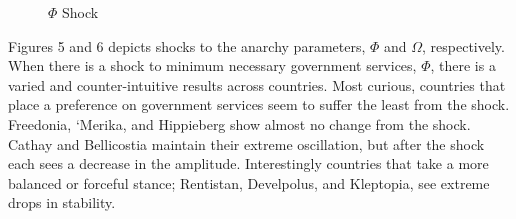 \documentclass[12pt]{article}
\begin{document}
\begin{spacing}{1.5}
\begin{figure}[htb]
\centering 
{} 
\caption{$\Phi$ Shock}
\end{figure}

Figures 5 and 6 depicts shocks to the anarchy parameters, $\Phi$ and $\Omega$, respectively. When there is a shock to minimum necessary government services, $\Phi$, there is a varied and counter-intuitive results across countries. Most curious, countries that place a preference on government services seem to suffer the least from the shock. Freedonia, `Merika, and Hippieberg show almost no change from the shock. Cathay and Bellicostia maintain their extreme oscillation, but after the shock each sees a decrease in the amplitude. Interestingly countries that take a more balanced or forceful stance; Rentistan, Develpolus, and Kleptopia, see extreme drops in stability. 


\end{spacing}
\end{document}
